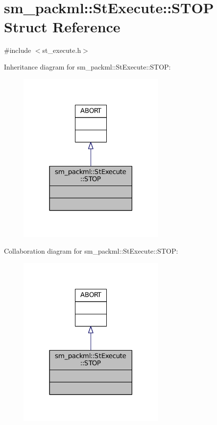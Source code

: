 \hypertarget{structsm__packml_1_1StExecute_1_1STOP}{}\section{sm\+\_\+packml\+:\+:St\+Execute\+:\+:S\+T\+OP Struct Reference}
\label{structsm__packml_1_1StExecute_1_1STOP}


{\ttfamily \#include $<$st\+\_\+execute.\+h$>$}



Inheritance diagram for sm\+\_\+packml\+:\+:St\+Execute\+:\+:S\+T\+OP\+:
\nopagebreak
\begin{figure}[H]
\begin{center}
\leavevmode
\includegraphics[width=206pt]{structsm__packml_1_1StExecute_1_1STOP__inherit__graph}
\end{center}
\end{figure}


Collaboration diagram for sm\+\_\+packml\+:\+:St\+Execute\+:\+:S\+T\+OP\+:
\nopagebreak
\begin{figure}[H]
\begin{center}
\leavevmode
\includegraphics[width=206pt]{structsm__packml_1_1StExecute_1_1STOP__coll__graph}
\end{center}
\end{figure}


